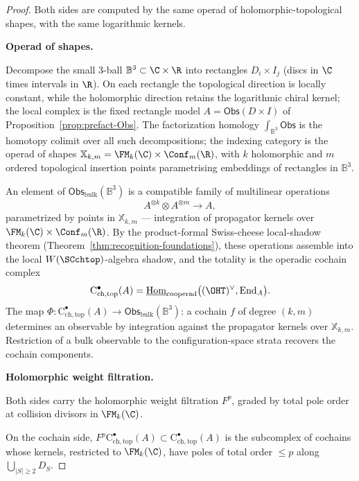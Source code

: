 \begin{proof}
Both sides are computed by the same operad of holomorphic-topological
shapes, with the same logarithmic kernels.

\medskip
\textbf{Operad of shapes.}

Decompose the small $3$-ball $\mathbb{B}^3 \subset \C \times \R$ into rectangles $D_i \times I_j$ (discs in $\C$ times intervals in $\R$). On each rectangle the topological direction is locally constant, while the holomorphic direction retains the logarithmic chiral kernel; the local complex is the fixed rectangle model \(A=\mathsf{Obs}(D\times I)\) of Proposition~\ref{prop:prefact-Obs}. The factorization homology $\int_{\mathbb{B}^3} \mathsf{Obs}$ is the homotopy colimit over all such decompositions; the indexing category is the operad of shapes $\mathbb{X}_{k,m} = \FM_k(\C) \times \Conf_m(\R)$, with $k$ holomorphic and $m$ ordered topological insertion points parametrising embeddings of rectangles in $\mathbb{B}^3$.

An element of $\mathsf{Obs}_{\mathrm{bulk}}(\mathbb{B}^3)$ is a compatible family of multilinear operations
\[
A^{\otimes k} \otimes A^{\otimes m} \longrightarrow A,
\]
parametrized by points in $\mathbb{X}_{k,m}$ — integration of propagator kernels over $\FM_k(\C) \times \Conf_m(\R)$. By the product-formal Swiss-cheese local-shadow theorem (Theorem~\ref{thm:recognition-foundations}), these operations assemble into the local $W(\SCchtop)$-algebra shadow, and the totality is the operadic cochain complex
\[
\mathrm{C}^\bullet_{\mathrm{ch,top}}(A) = \underline{\mathrm{Hom}}_{\text{cooperad}}\bigl((\OHT)^\vee, \mathrm{End}_A\bigr).
\]
The map $\Phi \colon \mathrm{C}^\bullet_{\mathrm{ch,top}}(A) \to \mathsf{Obs}_{\mathrm{bulk}}(\mathbb{B}^3)$: a cochain $f$ of degree $(k,m)$ determines an observable by integration against the propagator kernels over $\mathbb{X}_{k,m}$. Restriction of a bulk observable to the configuration-space strata recovers the cochain components.

\medskip
\textbf{Holomorphic weight filtration.}

Both sides carry the holomorphic weight filtration $F^p$, graded by total pole order at collision divisors in $\FM_k(\C)$.

On the cochain side, $F^p \mathrm{C}^\bullet_{\mathrm{ch,top}}(A) \subset \mathrm{C}^\bullet_{\mathrm{ch,top}}(A)$ is the subcomplex of cochains whose kernels, restricted to $\FM_k(\C)$, have poles of total order $\le p$ along $\bigcup_{|S| \geq 2} D_S$.


\end{proof}
